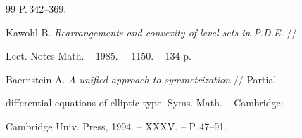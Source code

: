 \begin{thebibliography}{99}
P.\,342--369. 




Kawohl B. {\em Rearrangements and convexity of level sets in P.D.E.} // 


Lect. Notes Math. -- 1985. -- \No\,1150. -- 134 p. 




Baernstein A. {\em A unified approach to symmetrization} // Partial 


differential equations of elliptic type. Syms. Math. -- Cambridge:


Cambridge Univ. Press,  1994. -- XXXV. -- P.\,47--91. 


 


\end{thebibliography} 


 


\vskip 0.5cm 


 








 


\label{end} 


 


